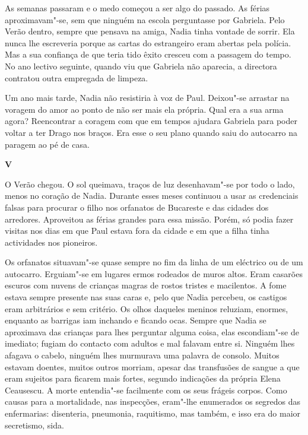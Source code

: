 As semanas passaram e o medo começou a ser algo do passado. As férias
aproximavam"-se, sem que ninguém na escola perguntasse por Gabriela. Pelo
Verão dentro, sempre que pensava na amiga, Nadia tinha vontade de
sorrir. Ela nunca lhe escreveria porque as cartas do estrangeiro eram
abertas pela polícia. Mas a sua confiança de que teria tido êxito
cresceu com a passagem do tempo. No ano lectivo seguinte, quando viu que
Gabriela não aparecia, a directora contratou outra empregada de limpeza.

Um ano mais tarde, Nadia não resistiria à voz de Paul. Deixou"-se
arrastar na voragem do amor ao ponto de não ser mais ela própria. Qual
era a sua arma agora? Reencontrar a coragem com que em tempos ajudara
Gabriela para poder voltar a ter Drago nos braços. Era esse o seu plano
quando saiu do autocarro na paragem ao pé de casa.


\pagebreak
\vspace*{1.8cm}
\noindent{}\textbf{V}

\bigskip

O Verão chegou. O sol queimava, traços de luz desenhavam"-se por todo o
lado, menos no coração de Nadia. Durante esses meses continuou a usar as
credenciais falsas para procurar o filho nos orfanatos de Bucareste e
das cidades dos arredores. Aproveitou as férias grandes para essa
missão. Porém, só podia fazer visitas nos dias em que Paul estava fora
da cidade e em que a filha tinha actividades nos pioneiros.

Os orfanatos situavam"-se quase sempre no fim da linha de um eléctrico ou
de um autocarro. Erguiam"-se em lugares ermos rodeados de muros altos.
Eram casarões escuros com nuvens de crianças magras de rostos tristes e
macilentos. A fome estava sempre presente nas suas caras e, pelo que
Nadia percebeu, os castigos eram arbitrários e sem critério. Os olhos
daqueles meninos reluziam, enormes, enquanto as barrigas iam inchando e
ficando ocas. Sempre que Nadia se aproximava das crianças para lhes
perguntar alguma coisa, elas escondiam"-se de imediato; fugiam do
contacto com adultos e mal falavam entre si. Ninguém lhes afagava o
cabelo, ninguém lhes murmurava uma palavra
de consolo. Muitos estavam doentes, muitos outros morriam, apesar das
transfusões de sangue a que eram sujeitos para ficarem mais fortes,
segundo indicações da própria Elena Ceausescu. A morte entendia"-se
facilmente com os seus frágeis corpos. Como causas para a mortalidade,
nas inspecções, eram"-lhe enumerados os segredos das enfermarias:
disenteria, pneumonia, raquitismo, mas também, e isso era do maior
secretismo, sida.

